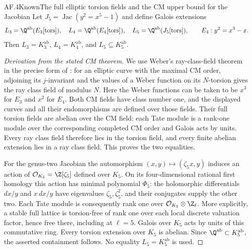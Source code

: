 \begin{statement}{AF.4}{Known}{The full elliptic torsion fields and the CM upper bound for the Jacobian}
Let $J_5=\operatorname{Jac}(y^2=x^5-1)$ and define Galois extensions
\[
 L_3=\Q^{\mathrm{ab}}(E_3[\mathrm{tors}]),\quad
 L_4=\Q^{\mathrm{ab}}(E_4[\mathrm{tors}]),\quad
 L_5=\Q^{\mathrm{ab}}(J_5[\mathrm{tors}]),
 \qquad E_4:y^2=x^3-x.
\]
Then $L_3=K_3^{\mathrm{ab}}$, $L_4=K_4^{\mathrm{ab}}$, and
$L_5\subseteq K_5^{\mathrm{ab}}$.
\end{statement}
\begin{proof}[Derivation from the stated CM theorem]
We use Weber's ray-class-field theorem in the precise form of
\citet[Theorem 8]{ClarkCookStankewicz2009}: for an elliptic curve
with the maximal CM order, adjoining its $j$-invariant and the
values of a Weber function on its $N$-torsion gives the ray class
field of modulus $N$. Here the Weber functions can be taken to
be $x^3$ for $E_3$ and $x^2$ for $E_4$. Both CM fields have class
number one, and the displayed curves and all their endomorphisms
are defined over those fields. Their full torsion fields are
abelian over the CM field: each Tate module is a rank-one module
over the corresponding completed CM order and Galois acts by
units. Every ray class field therefore lies in the torsion field,
and every finite abelian extension lies in a ray class field.
This proves the two equalities.

For the genus-two Jacobian the automorphism
$(x,y)\mapsto(\zeta_5x,y)$ induces an action of
$\mathcal O_{K_5}=\Z[\zeta_5]$ defined over $K_5$. On its
four-dimensional rational first homology this action has minimal
polynomial $\Phi_5$: the holomorphic differentials $dx/y$ and
$x\,dx/y$ have eigenvalues $\zeta_5,\zeta_5^2$, and their
conjugates supply the other two. Each Tate module is consequently
rank one over $\mathcal O_{K_5}\otimes\Z_\ell$. More explicitly,
a stable full lattice is torsion-free of rank one over each
local discrete valuation factor, hence free there, including at
$\ell=5$. Galois over $K_5$ acts by units of this commutative
ring. Every torsion extension over $K_5$ is abelian. Since
$\Q^{\mathrm{ab}}\subset K_5^{\mathrm{ab}}$, the asserted
containment follows. No equality $L_5=K_5^{\mathrm{ab}}$ is used.
\end{proof}

